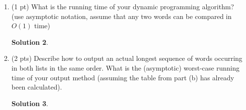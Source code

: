 \documentclass[11pt]{article}
\newtheorem*{solution}{Solution}
\begin{document}
\begin{enumerate}
\begin{enumerate}
\begin{solution}
\end{solution}
\newpage

\item (1 pt) What is the running time of your dynamic programming algorithm? (use asymptotic notation, assume that any two words can be compared in $O(1)$ time)
\begin{solution}

\end{solution}
\newpage

\item (2 pts) Describe how to output an actual longest sequence of words occurring in both lists in the same order.
What is the (asymptotic) worst-case running time of your output method (assuming the table from part (b) has already been calculated).
\begin{solution}

\end{solution}
\end{enumerate}  


\end{enumerate} 
\end{document}
